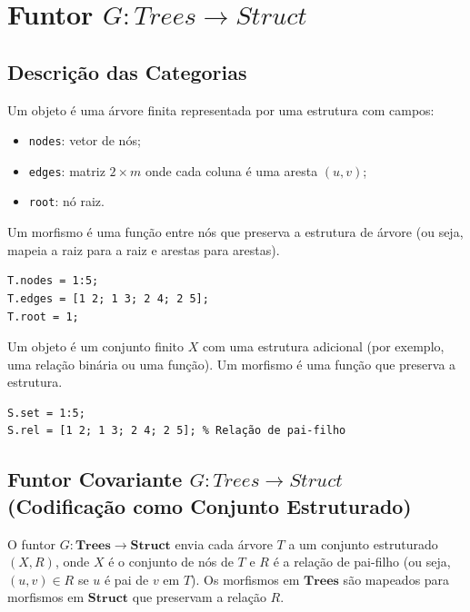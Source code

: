 \section{Funtor $G: Trees \to Struct$}
\label{sec:functor-trees-struct}

\subsection{Descrição das Categorias}

\begin{definition}
Um objeto é uma árvore finita representada por uma estrutura com campos:
\begin{itemize}
    \item \texttt{nodes}: vetor de nós;
    \item \texttt{edges}: matriz $2 \times m$ onde cada coluna é uma aresta $(u, v)$;
    \item \texttt{root}: nó raiz.
\end{itemize}
Um morfismo é uma função entre nós que preserva a estrutura de árvore (ou seja, mapeia a raiz para a raiz e arestas para arestas).
\end{definition}

\begin{lstlisting}[style=matlab, caption={Objeto e morfismo em $\mathbf{Trees}$}]
T.nodes = 1:5;
T.edges = [1 2; 1 3; 2 4; 2 5];
T.root = 1;
\end{lstlisting}

\begin{definition}
Um objeto é um conjunto finito $X$ com uma estrutura adicional (por exemplo, uma relação binária ou uma função). Um morfismo é uma função que preserva a estrutura.
\end{definition}

\begin{lstlisting}[style=matlab, caption={Objeto em $\mathbf{Struct}$}]
S.set = 1:5;
S.rel = [1 2; 1 3; 2 4; 2 5]; % Relação de pai-filho
\end{lstlisting}

\subsection{Funtor Covariante $G: Trees \to Struct$ (Codificação como Conjunto Estruturado)}

O funtor $G: \mathbf{Trees} \to \mathbf{Struct}$ envia cada árvore $T$ a um conjunto estruturado $(X, R)$, onde $X$ é o conjunto de nós de $T$ e $R$ é a relação de pai-filho (ou seja, $(u, v) \in R$ se $u$ é pai de $v$ em $T$). Os morfismos em $\mathbf{Trees}$ são mapeados para morfismos em $\mathbf{Struct}$ que preservam a relação $R$.

